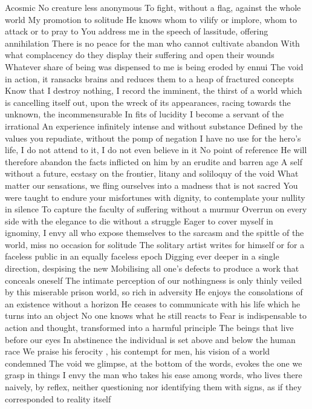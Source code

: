\documentclass{article}
\begin{document}
Acosmic
No creature less anonymous
To fight, without a flag, against the whole world
My promotion to solitude
He knows whom to vilify or implore, whom to attack or to pray to
You address me in the speech of lassitude, offering annihilation
There is no peace for the man who cannot cultivate abandon
With what complacency do they display their suffering and open their wounds
Whatever share of being was dispensed to me is being eroded by ennui
The void in action, it ransacks brains and reduces them to a heap of fractured concepts
Know that I destroy nothing, I record the imminent, the thirst of a world which is cancelling itself out, upon the wreck of its appearances, racing towards the unknown, the incommensurable
In fits of lucidity I become a servant of the irrational
An experience infinitely intense and without substance
Defined by the values you repudiate, without the pomp of negation
I have no use for the hero's life, I do not attend to it, I do not even believe in it
No point of reference
He will therefore abandon the facts inflicted on him by an erudite and barren age
A self without a future, ecstasy on the frontier, litany and soliloquy of the void
What matter our sensations, we fling ourselves into a madness that is not sacred
You were taught to endure your misfortunes with dignity, to contemplate your nullity in silence
To capture the faculty of suffering without a murmur
Overrun on every side with the elegance to die without a struggle
Eager to cover myself in ignominy, I envy all who expose themselves to the sarcasm and the spittle of the world, miss no occasion for solitude
The solitary artist writes for himself or for a faceless public in an equally faceless epoch
Digging ever deeper in a single direction, despising the new
Mobilising all one's defects to produce a work that conceals oneself
The intimate perception of our nothingness is only thinly veiled by this miserable prison world, so rich in adversity
He enjoys the consolations of an existence without a horizon
He ceases to communicate with his life which he turns into an object
No one knows what he still reacts to
Fear is indispensable  to action and thought, transformed into a harmful principle
The beings that live before our eyes
In abstinence the individual is set above and below the human race
We praise his ferocity , his contempt for men, his vision of a world condemned
The void we glimpse, at the bottom of the words, evokes the one we grasp in things
I envy the man who takes his ease among words, who lives there naively, by reflex, neither questioning nor identifying them with signs, as if they corresponded to reality itself
\end{document}
